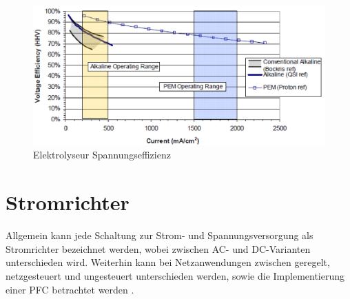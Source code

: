 \begin{figure}
	\centering
	\includegraphics[width=0.7\linewidth]{content/Grafiken/Ely-Efficiency}
	\caption[Elektrolyseur Spannungseffizienz]{Elektrolyseur Spannungseffizienz \cite{NOWH2}}
	\label{fig:ely-efficiency}
\end{figure}


\section{Stromrichter}
\label{sec:Stromrichter}
Allgemein kann jede Schaltung zur Strom- und Spannungsversorgung als Stromrichter bezeichnet werden, wobei zwischen AC- und DC-Varianten unterschieden wird. Weiterhin kann bei Netzanwendungen zwischen geregelt, netzgesteuert und ungesteuert unterschieden werden, sowie die Implementierung einer \gls{PFC} betrachtet werden \cite{Schroder.2018}.  
